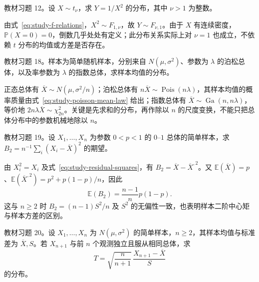 \begin{example}
\label{ex:study-reciprocal-t-square-exercise}
教材习题 12。设 $X\sim t_\nu$，求 $Y=1/X^2$ 的分布，其中 $\nu>1$ 为整数。
\end{example}

\begin{solve}
由式~\eqref{eq:study-f-relations}，$X^2\sim F_{1,\nu}$，故 $Y\sim F_{\nu,1}$。由于 $X$ 有连续密度，$\mathbb P(X=0)=0$，倒数几乎处处有定义；此分布关系实际上对 $\nu=1$ 也成立，不依赖 $t$ 分布的均值或方差是否存在。
\end{solve}

\begin{example}
\label{ex:study-sample-mean-laws-exercise}
教材习题 18。样本为简单随机样本，分别来自 $N(\mu,\sigma^2)$、参数为 $\lambda$ 的泊松总体，以及率参数为 $\lambda$ 的指数总体，求样本均值的分布。
\end{example}

\begin{solve}
正态总体有 $\overline X\sim N(\mu,\sigma^2/n)$；泊松总体有 $n\overline X\sim\operatorname{Pois}(n\lambda)$，其样本均值的概率质量由式~\eqref{eq:study-poisson-mean-law} 给出；指数总体有 $\overline X\sim\operatorname{Ga}(n,n\lambda)$，等价地 $2n\lambda\overline X\sim\chi^2_{2n}$。关键是先求和的分布，再作除以 $n$ 的尺度变换，不能只把总体分布中的参数机械地除以 $n$。
\end{solve}

\begin{example}
\label{ex:study-bernoulli-central-moment-exercise}
教材习题 19。设 $X_1,\ldots,X_n$ 为参数 $0<p<1$ 的 $0$--$1$ 总体的简单样本，求 $B_2=n^{-1}\sum_i(X_i-\overline X)^2$ 的期望。
\end{example}

\begin{solve}
由 $X_i^2=X_i$ 及式~\eqref{eq:study-residual-squares}，有 $B_2=\overline X-\overline X^{,2}$。又 $\mathbb E(\overline X)=p$、$\mathbb E(\overline X^{,2})=p^2+p(1-p)/n$，因此
\[
  \mathbb E(B_2)=\frac{n-1}{n}p(1-p).
\]
这与 $n\ge2$ 时 $B_2=(n-1)S^2/n$ 及 $S^2$ 的无偏性一致，也表明样本二阶中心矩与样本方差的区别。
\end{solve}

\begin{example}
\label{ex:study-normal-prediction-exercise}
教材习题 20。设 $X_1,\ldots,X_n$ 为 $N(\mu,\sigma^2)$ 的简单样本，$n\ge2$，其样本均值与标准差为 $\overline X,S$。若 $X_{n+1}$ 与前 $n$ 个观测独立且服从相同总体，求
\[
  T=\sqrt{\frac n{n+1}}\,\frac{X_{n+1}-\overline X}{S}
\]
的分布。
\end{example}

